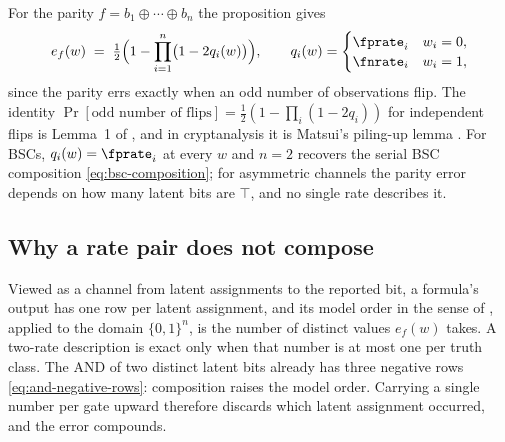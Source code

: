 \begin{remark}
\label{rem:parity-latent}
For the parity $f = b_1 \oplus \cdots \oplus b_n$ the proposition gives
\[
  e_f(w) \;=\; \tfrac{1}{2}\Bigl(1 - \prod_{i=1}^{n}\bigl(1 - 2 q_i(w)\bigr)\Bigr),
  \qquad
  q_i(w) = \begin{cases} \fprate_i & w_i = 0, \\ \fnrate_i & w_i = 1, \end{cases}
\]
since the parity errs exactly when an odd number of observations flip. The
identity $\Pr[\text{odd number of flips}] = \frac{1}{2}(1 - \prod_i(1 -
2q_i))$ for independent flips is Lemma~1 of \textcite{gallager-1962}, and in
cryptanalysis it is Matsui's piling-up lemma
\parencite{matsui-1993}. For BSCs, $q_i(w) = \fprate_i$ at every $w$ and
$n = 2$ recovers the serial BSC composition \eqref{eq:bsc-composition}; for
asymmetric channels the parity error depends on how many latent bits are
$\top$, and no single rate describes it.
\end{remark}

\subsection*{Why a rate pair does not compose}

Viewed as a channel from latent assignments to the reported bit, a formula's
output has one row per latent assignment, and its model order in the sense of
, applied to the domain $\{0,1\}^n$, is the number of
distinct values $e_f(w)$ takes. A two-rate description is exact only when that
number is at most one per truth class. The AND of two distinct latent bits
already has three negative rows \eqref{eq:and-negative-rows}: composition
raises the model order. Carrying a single number per gate upward therefore
discards which latent assignment occurred, and the error compounds.

